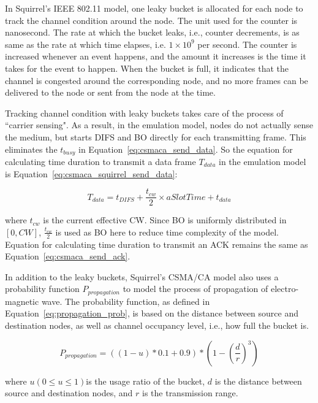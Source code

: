 \documentclass[12pt]{report}
\begin{document}
In Squirrel's IEEE 802.11 model, one leaky bucket is allocated for each node to track the channel condition around the node. The unit used for the counter is nanosecond. The rate at which the bucket leaks, i.e., counter decrements, is as same as the rate at which time elapses, i.e. $1\times 10^9$ per second. The counter is increased whenever an event happens, and the amount it increases is the time it takes for the event to happen. When the bucket is full, it indicates that the channel is congested around the corresponding node, and no more frames can be delivered to the node or sent from the node at the time.

Tracking channel condition with leaky buckets takes care of the process of ``carrier sensing". As a result, in the emulation model, nodes do not actually sense the medium, but starts DIFS and BO directly for each transmitting frame. This eliminates the $t_{busy}$ in Equation~\ref{eq:csmaca_send_data}. So the equation for calculating time duration to transmit a data frame $T_{data}$ in the emulation model is Equation~\ref{eq:csmaca_squirrel_send_data}:

\begin{equation}
  T_{data}=t_{DIFS}+\frac{t_{cw}}{2}\times aSlotTime+t_{data}
  \label{eq:csmaca_squirrel_send_data}
\end{equation}

where $t_{cw}$ is the current effective CW. Since BO is uniformly distributed in $[0,CW]$, $\frac{t_{cw}}{2}$ is used as BO here to reduce time complexity of the model. Equation for calculating time duration to transmit an ACK remains the same as Equation~\ref{eq:csmaca_send_ack}.

In addition to the leaky buckets, Squirrel's CSMA/CA model also uses a probability function $P_{propagation}$ to model the process of propagation of electro-magnetic wave. The probability function, as defined in Equation~\ref{eq:propagation_prob}, is based on the distance between source and destination nodes, as well as channel occupancy level, i.e., how full the bucket is.

\begin{equation}
  P_{propagation}=((1-u) * 0.1 + 0.9) * (1-(\frac{d}{r})^3)
  \label{eq:propagation_prob}
\end{equation}

where $u(0\le u\le 1)$is the usage ratio of the bucket, $d$ is the distance between source and destination nodes, and $r$ is the transmission range.
\end{document}
